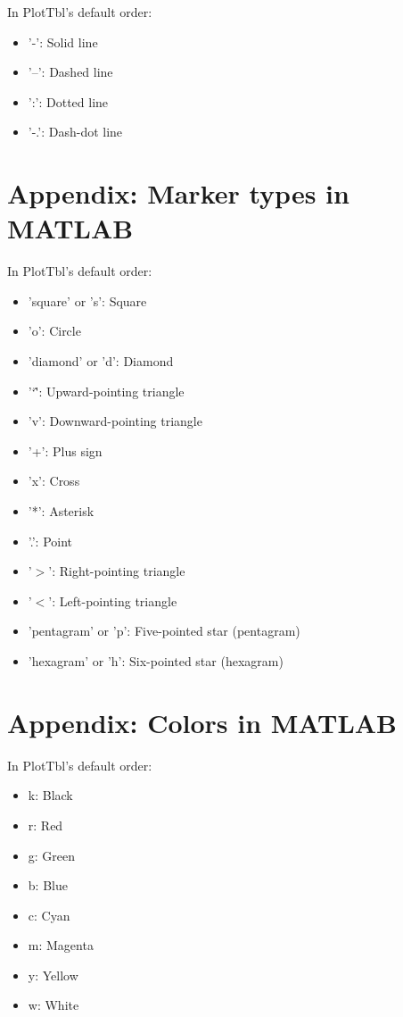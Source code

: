 \documentclass{article}
\newcommand{\caret}{\char`\^}
\begin{document}
In PlotTbl's default order:

\begin{itemize}
\item '-': Solid line
\item '--': Dashed line
\item ':': Dotted line
\item '-.': Dash-dot line
\end{itemize}

\section{Appendix: Marker types in MATLAB}

In PlotTbl's default order:

\begin{itemize}
\item 'square' or 's': Square
\item 'o': Circle
\item 'diamond' or 'd': Diamond
\item '\caret': Upward-pointing triangle
\item 'v': Downward-pointing triangle
\item '+': Plus sign
\item 'x': Cross
\item '*': Asterisk
\item '.': Point
\item '$>$': Right-pointing triangle
\item '$<$': Left-pointing triangle
\item 'pentagram' or 'p': Five-pointed star (pentagram)
\item 'hexagram' or 'h': Six-pointed star (hexagram)
\end{itemize}

\section{Appendix: Colors in MATLAB}

In PlotTbl's default order:

\begin{itemize}
\item k: Black
\item r: Red
\item g: Green
\item b: Blue
\item c: Cyan
\item m: Magenta
\item y: Yellow
\item w: White
\end{itemize}
\end{document}
